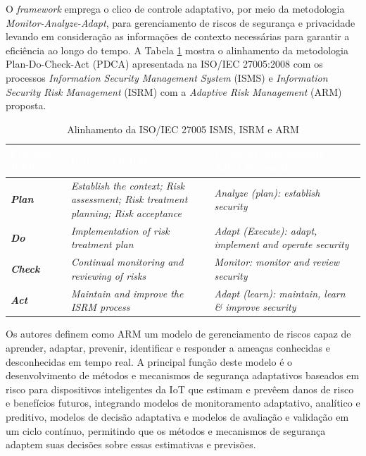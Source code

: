 \documentclass[tid,table]{texufpel} %
\begin{document}
O \textit{framework} emprega o clico de controle adaptativo, por meio da metodologia \textit{Monitor-Analyze-Adapt}, para gerenciamento de riscos de segurança e privacidade levando em consideração as informações de contexto necessárias para garantir a eficiência ao longo do tempo. A Tabela \ref{aligment-iso-27005} mostra o alinhamento da metodologia Plan-Do-Check-Act (PDCA) apresentada na ISO/IEC 27005:2008 com os processos \textit{Information Security Management System} (ISMS) e \textit{Information Security Risk Management} (ISRM) com a \textit{Adaptive Risk Management} (ARM) proposta.

        \begin{table}[h]
        \centering
	\caption{Alinhamento da ISO/IEC 27005 ISMS, ISRM e ARM}
	\label{aligment-iso-27005}
	\begin{tabular}{p{2cm}|p{6cm}|p{6cm}}
	\rowcolor[HTML]{003366}
	\textcolor{white}{\textbf{Processo ISMS}} & \textcolor{white}{\textbf{Processo ISRM}} & \textcolor{white}{\textbf{Processo/Metodologia ARM Proposto}} \\
	\hline
	\cellcolor[HTML]{E5EAEA} \textbf{\textit{Plan}} & \textit{Establish the context; Risk assessment; Risk treatment planning; Risk acceptance} & \textit{Analyze (plan): establish security} \\
	\hline
	\cellcolor[HTML]{E5EAEA} \textbf{\textit{Do}} & \textit{Implementation of risk treatment plan} & \textit{Adapt (Execute): adapt, implement and operate security} \\
	\hline
	\cellcolor[HTML]{E5EAEA} \textbf{\textit{Check}} & \textit{Continual monitoring and reviewing of risks} & \textit{Monitor: monitor and review security} \\
	\hline
	\cellcolor[HTML]{E5EAEA} \textbf{\textit{Act}} & \textit{Maintain and improve the ISRM process} & \textit{Adapt (learn): maintain, learn \& improve security}
	\end{tabular}
	\end{table}

Os autores definem como ARM um modelo de gerenciamento de riscos capaz de aprender, adaptar, prevenir, identificar e responder a ameaças conhecidas e desconhecidas em tempo real. A principal função deste modelo é o desenvolvimento de métodos e mecanismos de segurança adaptativos baseados em risco para dispositivos inteligentes da IoT que estimam e prevêem danos de risco e benefícios futuros, integrando modelos de monitoramento adaptativo, analítico e preditivo, modelos de decisão adaptativa e modelos de avaliação e validação em um ciclo contínuo, permitindo que os métodos e mecanismos de segurança adaptem suas decisões sobre essas estimativas e previsões.
\end{document}
